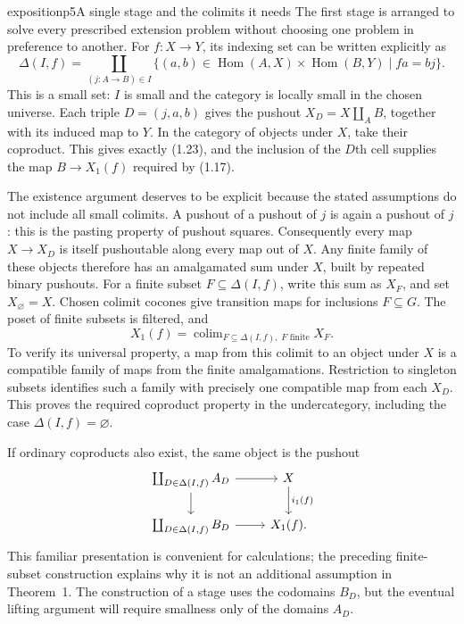 \begin{dcomment}{exposition}{p5}{A single stage and the colimits it needs}
The first stage is arranged to solve every prescribed extension problem without choosing one problem in preference to another. For $f:X\to Y$, its indexing set can be written explicitly as
\[
 \Delta(I,f)=\coprod_{(j:A\to B)\in I}
 \{(a,b)\in\operatorname{Hom}(A,X)\times
                   \operatorname{Hom}(B,Y)\mid fa=bj\}.
\]
This is a small set: $I$ is small and the category is locally small in the chosen universe. Each triple $D=(j,a,b)$ gives the pushout $X_D=X\amalg_A B$, together with its induced map to $Y$. In the category of objects under $X$, take their coproduct. This gives exactly (1.23), and the inclusion of the $D$th cell supplies the map $B\to X_1(f)$ required by (1.17).

The existence argument deserves to be explicit because the stated assumptions do not include all small colimits. A pushout of a pushout of $j$ is again a pushout of $j$: this is the pasting property of pushout squares. Consequently every map $X\to X_D$ is itself pushoutable along every map out of $X$. Any finite family of these objects therefore has an amalgamated sum under $X$, built by repeated binary pushouts. For a finite subset $F\subseteq\Delta(I,f)$, write this sum as $X_F$, and set $X_{\varnothing}=X$. Chosen colimit cocones give transition maps for inclusions $F\subseteq G$. The poset of finite subsets is filtered, and
\[
 X_1(f)=\mathop{\mathrm{colim}}_{F\subseteq\Delta(I,f),\;F\text{ finite}} X_F.
\]
To verify its universal property, a map from this colimit to an object under $X$ is a compatible family of maps from the finite amalgamations. Restriction to singleton subsets identifies such a family with precisely one compatible map from each $X_D$. This proves the required coproduct property in the undercategory, including the case $\Delta(I,f)=\varnothing$.

If ordinary coproducts also exist, the same object is the pushout
\[
\begin{tikzcd}
 \coprod_{D\in\Delta(I,f)} A_D \arrow[r]\arrow[d] & X\arrow[d,"i_1(f)"]\\
 \coprod_{D\in\Delta(I,f)} B_D \arrow[r] & X_1(f).
\end{tikzcd}
\]
This familiar presentation is convenient for calculations; the preceding finite-subset construction explains why it is not an additional assumption in Theorem~1. The construction of a stage uses the codomains $B_D$, but the eventual lifting argument will require smallness only of the domains $A_D$.
\end{dcomment}

